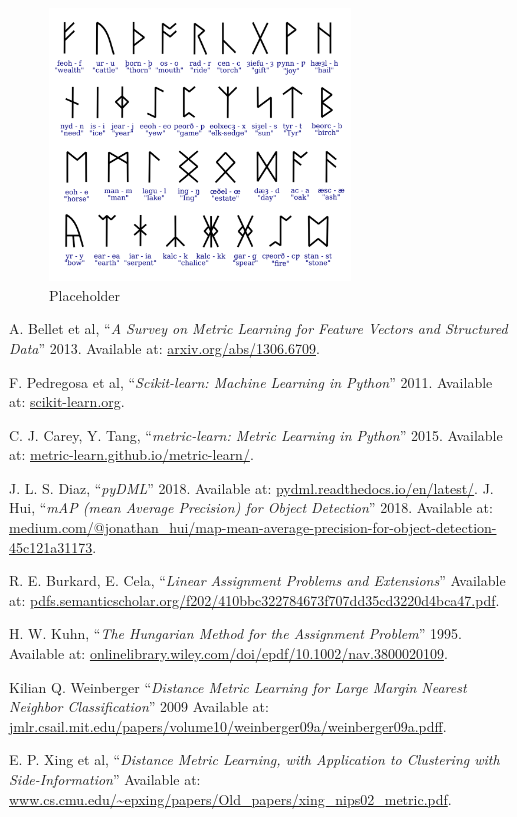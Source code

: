 \documentclass[journal]{IEEEtran}
\begin{document}
\begin{figure}[H]
  \centering
  \includegraphics[width=8cm]{img/placeholder}
  \caption{Placeholder}
  \label{ph}
\end{figure}

\begin{thebibliography}{1}

    A. Bellet et al,
    ``\textit{A Survey on Metric Learning for Feature Vectors and Structured Data}''
    2013.
    Available at: \url{arxiv.org/abs/1306.6709}.

    F. Pedregosa et al,
    ``\textit{Scikit-learn: Machine Learning in Python}''
    2011.
    Available at: \url{scikit-learn.org}.
    
    C. J. Carey, Y. Tang,
    ``\textit{metric-learn: Metric Learning in Python}''
    2015.
    Available at: \url{metric-learn.github.io/metric-learn/}.

    J. L. S. Diaz,
    ``\textit{pyDML}''
    2018.
    Available at: \url{pydml.readthedocs.io/en/latest/}.
    J. Hui,
    ``\textit{mAP (mean Average Precision) for Object Detection}''
    2018.
    Available at: \url{medium.com/@jonathan_hui/map-mean-average-precision-for-object-detection-45c121a31173}.

    R. E. Burkard, E. Cela,
    ``\textit{Linear Assignment Problems and Extensions}''
    Available at: \url{pdfs.semanticscholar.org/f202/410bbc322784673f707dd35cd3220d4bca47.pdf}.

    H. W. Kuhn,
    ``\textit{The Hungarian Method for the Assignment Problem}''
    1995.
    Available at: \url{onlinelibrary.wiley.com/doi/epdf/10.1002/nav.3800020109}.

    Kilian Q. Weinberger
    ``\textit{Distance Metric Learning for Large Margin
    Nearest Neighbor Classification}''
    2009
    Available at: \url{jmlr.csail.mit.edu/papers/volume10/weinberger09a/weinberger09a.pdff}.

    E. P. Xing et al,
    ``\textit{Distance Metric Learning, with Application to Clustering with Side-Information}''
    Available at: \url{www.cs.cmu.edu/~epxing/papers/Old_papers/xing_nips02_metric.pdf}.

\end{thebibliography}
\end{document}
